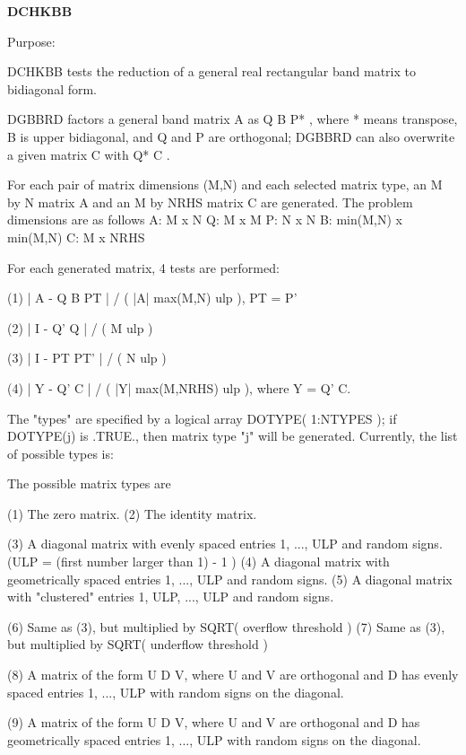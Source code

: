 {\bfseries D\+C\+H\+K\+B\+B} 

\begin{DoxyParagraph}{Purpose\+: }
\begin{DoxyVerb} DCHKBB tests the reduction of a general real rectangular band
 matrix to bidiagonal form.

 DGBBRD factors a general band matrix A as  Q B P* , where * means
 transpose, B is upper bidiagonal, and Q and P are orthogonal;
 DGBBRD can also overwrite a given matrix C with Q* C .

 For each pair of matrix dimensions (M,N) and each selected matrix
 type, an M by N matrix A and an M by NRHS matrix C are generated.
 The problem dimensions are as follows
    A:          M x N
    Q:          M x M
    P:          N x N
    B:          min(M,N) x min(M,N)
    C:          M x NRHS

 For each generated matrix, 4 tests are performed:

 (1)   | A - Q B PT | / ( |A| max(M,N) ulp ), PT = P'

 (2)   | I - Q' Q | / ( M ulp )

 (3)   | I - PT PT' | / ( N ulp )

 (4)   | Y - Q' C | / ( |Y| max(M,NRHS) ulp ), where Y = Q' C.

 The "types" are specified by a logical array DOTYPE( 1:NTYPES );
 if DOTYPE(j) is .TRUE., then matrix type "j" will be generated.
 Currently, the list of possible types is:

 The possible matrix types are

 (1)  The zero matrix.
 (2)  The identity matrix.

 (3)  A diagonal matrix with evenly spaced entries
      1, ..., ULP  and random signs.
      (ULP = (first number larger than 1) - 1 )
 (4)  A diagonal matrix with geometrically spaced entries
      1, ..., ULP  and random signs.
 (5)  A diagonal matrix with "clustered" entries 1, ULP, ..., ULP
      and random signs.

 (6)  Same as (3), but multiplied by SQRT( overflow threshold )
 (7)  Same as (3), but multiplied by SQRT( underflow threshold )

 (8)  A matrix of the form  U D V, where U and V are orthogonal and
      D has evenly spaced entries 1, ..., ULP with random signs
      on the diagonal.

 (9)  A matrix of the form  U D V, where U and V are orthogonal and
      D has geometrically spaced entries 1, ..., ULP with random
      signs on the diagonal.


\end{DoxyVerb}
\end{DoxyParagraph}
